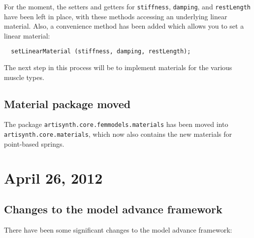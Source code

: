 \documentclass{article}
\begin{document}
For the moment, the setters and getters for {\tt stiffness}, {\tt damping},
and {\tt restLength} have been left in place, with these methods accessing
an underlying linear material. Also, a convenience method has been
added which allows you to set a linear material:

\begin{verbatim}
  setLinearMaterial (stiffness, damping, restLength);
\end{verbatim}

The next step in this process will be to implement materials for the
various muscle types.

\subsection*{Material package moved}

The package {\tt artisynth.core.femmodels.materials} has been moved into
{\tt artisynth.core.materials}, which now also contains the new materials for
point-based springs.

\section*{April 26, 2012}

\subsection*{Changes to the model advance framework}

There have been some significant changes to the model advance
framework:
\end{document}
